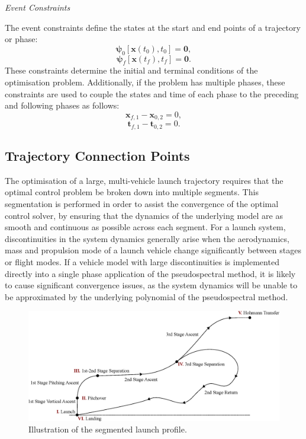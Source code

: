\noindent \textit{Event Constraints}

\noindent The event constraints define the states at the start and end points of a trajectory or phase:
\begin{equation}
\mathbf{\psi}_0[\textbf{x}(t_{0}), t_{0}] = \textbf{0},
\end{equation}
\begin{equation} \label{eq:2}
\mathbf{\psi}_f[\textbf{x}(t_{f}), t_{f}] = \textbf{0}.
\end{equation}
These constraints determine the initial and terminal conditions of the optimisation problem. Additionally, if the problem has multiple phases, these constraints are used to couple the states and time of each phase to the preceding and following phases as follows:
\begin{equation}
\textbf{x}_{f,1} - \textbf{x}_{0,2} = 0,
\end{equation}
\begin{equation}
\textbf{t}_{f,1} - \textbf{t}_{0,2} = 0.
\end{equation}
















\subsection{Trajectory Connection Points}
The optimisation of a large, multi-vehicle launch trajectory requires that the optimal control problem be broken down into multiple segments. This segmentation is performed in order to assist the convergence of the optimal control solver, by ensuring that the dynamics of the underlying model are as smooth and continuous as possible across each segment. 
For a launch system, discontinuities in the system dynamics generally arise when the aerodynamics, mass and propulsion mode of a launch vehicle change significantly between stages or flight modes. 
If a vehicle model with large discontinuities is implemented directly into a single phase application of the pseudospectral method, it is likely to cause significant convergence issues, as the system dynamics will be unable to be approximated by the underlying polynomial of the pseudospectral method. 
 \begin{figure}[ht]
 	\centering
 	\includegraphics[width=1.\linewidth]{figures/4_LODESTAR/Traj}
 	\caption{Illustration of the segmented launch profile.}
 	\label{fig:Traj}
 \end{figure}
 
